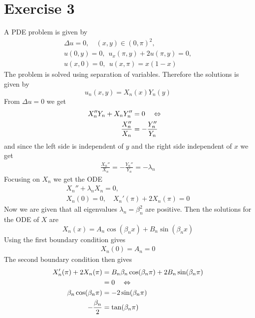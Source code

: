     \section*{Exercise 3}
    A PDE problem is given by
    \begin{gather*}
        \Delta u = 0,\quad (x,y)\in(0,\pi)^2, \\
        u(0,y)=0,\:\: u_x(\pi,y)+2u(\pi,y)=0,\\
        u(x,0)=0,\:\: u(x,\pi)=x(1-x)
    \end{gather*}
    The problem is solved using separation of variables. Therefore the solutions is given by
    \begin{equation*}
        u_n(x,y) = X_n(x)Y_n(y)
    \end{equation*}
    From $\Delta u=0$ we get
    \begin{align*}
        X_n''Y_n + X_nY_n'' &= 0 \quad\Leftrightarrow\quad\\
        \frac{X_n''}{X_n} &= -\frac{Y_n''}{Y_n}
    \end{align*}
    and since the left side is independent of $y$ and the right side independent of $x$ we get
    \begin{align}\label{eq:sep}
        \frac{X_n''}{X_n} = -\frac{Y_n''}{Y_n} = -\lambda_n
    \end{align}
    Focusing on $X_n$ we get the ODE
    \begin{gather*}
        X_n'' + \lambda_n X_n = 0, \\
        X_n(0) = 0,\quad X_n'(\pi) + 2X_n(\pi) = 0
    \end{gather*}
    Now we are given that all eigenvalues $\lambda_n=\beta_n^2$ are positive. Then the solutions for the ODE of $X$ are
    \begin{equation*}
        X_n(x) = A_n\cos(\beta_n x) + B_n\sin(\beta_n x)
    \end{equation*}
    Using the first boundary condition gives
    \begin{align*}
        X_n(0) = A_n = 0
    \end{align*}
    The second boundary condition then gives
    \begin{align*}
        X_n'(\pi) + 2X_n(\pi) &= B_n\beta_n\cos(\beta_n \pi) + 2B_n\sin(\beta_n \pi) \\
        &= 0 \quad\Leftrightarrow\quad \\
        \beta_n\cos(\beta_n\pi) &= -2\sin(\beta_n\pi) \\
        -\frac{\beta_n}{2} &= \tan(\beta_n\pi)
    \end{align*}
